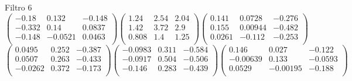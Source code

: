 Filtro 6
{ \small
\[
\begin{pmatrix}
  -0.18 & 0.132 & -0.148 \\
  -0.332 & 0.14 & 0.0837 \\
  -0.148 & -0.0521 & 0.0463 \\
\end{pmatrix}
\begin{pmatrix}
  1.24 & 2.54 & 2.04 \\
  1.42 & 3.72 & 2.9 \\
  0.808 & 1.4 & 1.25 \\
\end{pmatrix}
\begin{pmatrix}
  0.141 & 0.0728 & -0.276 \\
  0.155 & 0.00944 & -0.482 \\
  0.0261 & -0.112 & -0.253 \\
\end{pmatrix}
\]
\[
\begin{pmatrix}
  0.0495 & 0.252 & -0.387 \\
  0.0507 & 0.263 & -0.433 \\
  -0.0262 & 0.372 & -0.173 \\
\end{pmatrix}
\begin{pmatrix}
  -0.0983 & 0.311 & -0.584 \\
  -0.0917 & 0.504 & -0.506 \\
  -0.146 & 0.283 & -0.439 \\
\end{pmatrix}
\begin{pmatrix}
  0.146 & 0.027 & -0.122 \\
  -0.00639 & 0.133 & -0.0593 \\
  0.0529 & -0.00195 & -0.188 \\
\end{pmatrix}
\]
}

